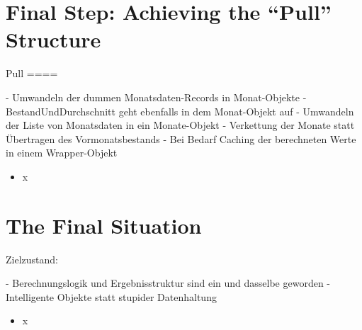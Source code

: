 \documentclass[a4paper,fleqn,titlepage,11pt]{article}
\begin{document}
\section{Final Step: Achieving the ``Pull'' Structure}



Pull
====

- Umwandeln der dummen Monatsdaten-Records in Monat-Objekte
- BestandUndDurchschnitt geht ebenfalls in dem Monat-Objekt auf
- Umwandeln der Liste von Monatsdaten in ein Monate-Objekt
- Verkettung der Monate statt Übertragen des Vormonatsbestands
- Bei Bedarf Caching der berechneten Werte in einem Wrapper-Objekt

\begin{itemize}
\item x
\end{itemize}

\section{The Final Situation}

Zielzustand:

- Berechnungslogik und Ergebnisstruktur sind ein und dasselbe geworden
- Intelligente Objekte statt stupider Datenhaltung

\begin{itemize}
\item x
\end{itemize}
\end{document}
